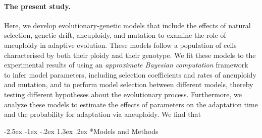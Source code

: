 \documentclass[12pt]{extarticle}
\makeatletter
\renewcommand\section{\@startsection {section}{1}{\z@}%
     {-2.5ex \@plus -1ex \@minus -.2ex}%
     {1.3ex \@plus.2ex}%
    {\Large\bfseries}}
\makeatother
\begin{document}
\paragraph*{The present study.}
Here, we develop evolutionary-genetic models that include the effects of natural selection, genetic drift, aneuploidy, and mutation to examine the role of aneuploidy in adaptive evolution.
These models follow a population of cells characterised by both their ploidy and their genotype.
We fit these models to the experimental results of \citet{Yona2012} using an \emph{approximate Bayesian computation} framework~\citep{Sisson2009, Klinger2018} to infer model parameters, including selection coefficients and rates of aneuploidy and mutation, and to perform model selection between different models, thereby testing different hypotheses about the evolutionary process.
Furthermore, we analyze these models to estimate the effects of parameters on the adaptation time and the probability for adaptation via aneuploidy.
We find that %

\pagebreak
\section*{Models and Methods}
\end{document}
